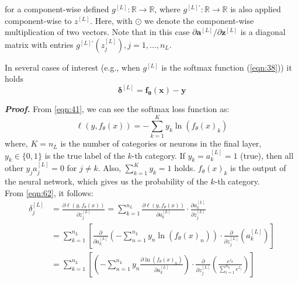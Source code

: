 for a component-wise defined $g^{[L]}: \mathbb{R} \rightarrow \mathbb{R}$, where $g^{[L]'}: \mathbb{R} \rightarrow \mathbb{R}$ is also applied component-wise to $z^{[L]}$. Here, with $\odot$ we denote the component-wise multiplication of two vectors. Note that in this case $\partial \boldsymbol{a}^{[L]} / \partial \boldsymbol{z}^{[L]}$ is a diagonal matrix with entries $g^{[L]'} \left( z_j^{[L]} \right), j= 1, \ldots, n_L$.

\begin{remark}
In several cases of interest (e.g., when $g^{[L]}$ is the softmax function (\ref{eqn:38})) it holds
\begin{equation}
    \boldsymbol{\delta}^{[L]} = \boldsymbol{f_\theta(x)} - \boldsymbol{y}
    \label{eqn:71}
\end{equation}
\end{remark}

\textbf{\emph{Proof.}} From \ref{eqn:41}, we can see the softmax loss function as:
\begin{equation}
    \ell(y, f_\theta(x)) = - \sum_{k=1}^{K}y_k \ln(f_\theta(x)_k)
    \label{eqn:72}
\end{equation}
where,
$K = n_L$ is the number of categories or neurons in the final layer, $y_k \in \{0,1\}$ is the true label of the $k$-th category. If $y_k = a_k^{[L]} = 1$ (true), then all other $y_j a_j^{[L]} = 0$ for $j \neq k$. Also, $\sum_{k=1}^{K}y_k =1$ holds. $f_\theta(x)_k$ is the output of the neural network, which gives us the probability of the $k$-th category.\\

From \ref{eqn:62}, it follows:
\begin{equation}
    \begin{aligned}
    \delta_j^{[L]} &= \frac{\partial \ell(y, f_\theta(x))}{\partial z_j^{[L]}} = \sum_{k=1}^{n_L} \frac{\partial \ell(y, f_\theta(x))}{\partial a_k^{[L]}} \cdot \frac{\partial a_k^{[L]}}{\partial z_j^{[L]}}\\
    &= \sum_{k=1}^{n_L} \left[ \frac{\partial}{\partial a_k^{[L]}} \left(- \sum_{n=1}^{n_L}y_n \ln(f_\theta(x)_n)\right) \cdot \frac{\partial}{\partial z_j^{[L]}} \left( a_k^{[L]} \right) \right]\\
    & = \sum_{k=1}^{n_L} \left[ \left(- \sum_{n=1}^{n_L}y_n \frac{\partial \ln(f_\theta(x)_n)}{\partial a_k^{[L]}} \right) \cdot \frac{\partial}{\partial z_j^{[L]}} \left( \frac{e^{z_k}}{\sum_{i=1}^{n_L}e^{z_i}} \right) \right]\\
    \end{aligned}
    \label{eqn:73}
\end{equation}

